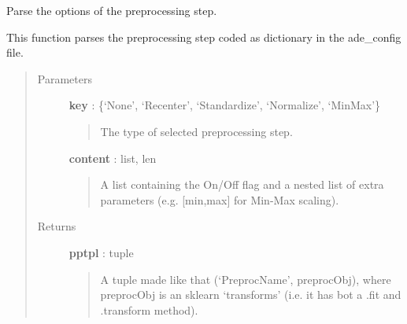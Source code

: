 \documentclass[letterpaper,10pt,english]{sphinxmanual}
\begin{document}
\begin{fulllineitems}
\label{index:adenine.core.define_pipeline.parse_preproc}
Parse the options of the preprocessing step.

This function parses the preprocessing step coded as dictionary in the ade\_config file.
\begin{quote}\begin{description}
\item[{Parameters}] \leavevmode
\textbf{key} : \{`None', `Recenter', `Standardize', `Normalize', `MinMax'\}
\begin{quote}

The type of selected preprocessing step.
\end{quote}

\textbf{content} : list, len
\begin{quote}

A list containing the On/Off flag and a nested list of extra parameters (e.g. {[}min,max{]} for Min-Max scaling).
\end{quote}

\item[{Returns}] \leavevmode
\textbf{pptpl} : tuple
\begin{quote}

A tuple made like that (`PreprocName', preprocObj), where preprocObj is an sklearn `transforms' (i.e. it has bot a .fit and .transform method).
\end{quote}

\end{description}\end{quote}

\end{fulllineitems}

\end{document}
